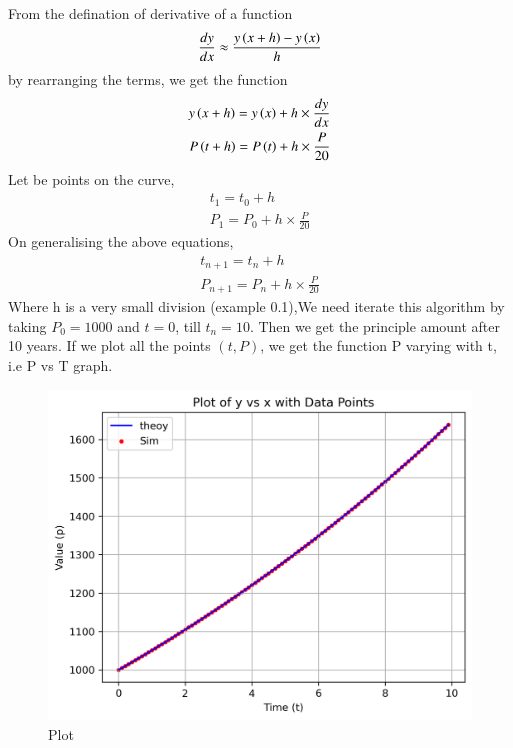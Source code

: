 \documentclass[journal]{IEEEtran}
\begin{document}
From the defination of derivative of a function 
\begin{align}
\frac{dy}{dx} \approx \frac{y\left(x+h\right)-y\left(x\right)}{h} \label{11}
\end{align}
by rearranging the terms, we get the function
\begin{align}
y\left(x+h\right)=y\left(x\right)+h \times \frac{dy}{dx} \\
P\left(t+h\right)=P\left(t\right)+h \times \frac{P}{20}
\end{align}
Let  be points on the curve,
\begin{align}
t_1=t_0+h \\
P_1=P_0+h \times \frac{P}{20}
\end{align}
On  generalising the above equations,
\begin{align}
t_{n+1}=t_{n}+h \\
P_{n+1}=P_{n}+h \times \frac{P}{20}
\end{align}
Where h is a very small division (example 0.1),We need iterate this algorithm by taking $P_0=1000$ and $t=0$, till $t_n=10$. Then we get the principle amount after 10 years.
If we plot all the points $(t,P)$, we get the function P varying with t, i.e P vs T graph.



\begin{figure}[htbp] %
    \centering
    \includegraphics[width=\textwidth]{fig/plot.png} %
    \caption{Plot}
\end{figure}
\end{document}
